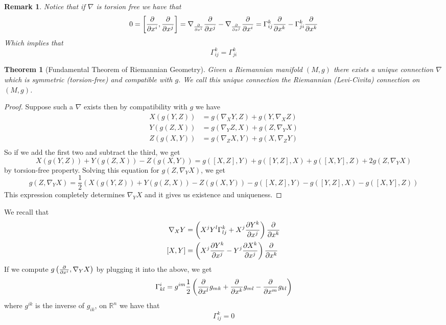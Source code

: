\documentclass[a4paper]{article}
\newtheorem*{thm}{Theorem}
\newtheorem*{rem}{Remark}
\begin{document}
\begin{rem}
 Notice that if $\nabla$ is torsion free we have that
 \[
   0 = \left[ \pdv{x^i}, \pdv{x^j} \right] = \nabla_{\pdv{x^i}} \pdv{x^j} - \nabla_{\pdv{x^j}} \pdv{x^i} = \Gamma_{ij}^k \pdv{x^k} - \Gamma_{ji}^k \pdv{x^k}
 \]
 Which implies that
 \[
   \Gamma_{ij}^k = \Gamma_{ji}^k
 \]
\end{rem}

\begin{thm}[Fundamental Theorem of Riemannian Geometry]
  Given a Riemannian manifold $(M,g)$ there exists a unique connection $\nabla$ which is symmetric (torsion-free) and compatible with $g$. We call this unique connection the Riemannian (Levi-Civita) connection on $(M,g)$.
\end{thm}

\begin{proof}
  Suppose such a $\nabla$ exists then by compatibility with $g$ we have 
  \[
    \begin{aligned}
      X \left( g \left( Y, Z \right) \right) &= g \left( \nabla_X Y, Z \right) + g \left( Y, \nabla_X Z \right) \\
      Y \left( g \left( Z, X \right) \right) &= g \left( \nabla_Y Z, X \right) + g \left( Z, \nabla_Y X \right) \\
      Z \left( g \left( X, Y \right) \right) &= g \left( \nabla_Z X, Y \right) + g \left( X, \nabla_Z Y \right) \\
    \end{aligned}
  \]
  So if we add the first two and subtract the third, we get
  \[
    X(g(Y,Z)) + Y(g(Z,X)) - Z(g(X,Y)) = g([X,Z], Y) + g([Y,Z], X) + g([X,Y],Z) + 2 g (Z, \nabla_Y X)
  \]
  by torsion-free property. Solving this equation for $g(Z, \nabla_Y X)$, we get 
  \[
    g(Z, \nabla_Y X) = \frac{1}{2}  \left( X(g(Y,Z)) + Y(g(Z,X)) - Z(g(X,Y)) - g([X,Z], Y) - g([Y,Z], X) - g([X,Y], Z) \right) 
  \]
  This expression completely determines $\nabla_Y X$ and it gives us existence and uniqueness.
\end{proof}
We recall that
\[
  \begin{aligned}
    \nabla_X Y &= \left(X^jY^l \Gamma_{lj}^k + X^j \pdv{Y^k}{x^j}\right) \pdv{x^k} \\
    [X,Y] &= \left( X^j \pdv{Y^k}{x^j} - Y^j \pdv{X^k}{x^j} \right) \pdv{x^k}
  \end{aligned}
\]
If we compute $g \left( \pdv{x^i}, \nabla_Y X \right)$ by plugging it into the above, we get
\[
  \Gamma_{kl}^i = g^{im} \frac{1}{2} \left( \pdv{x^l}g_{mk} + \pdv{x^k}g_{ml} - \pdv{x^m}g_{kl} \right)
\]
where $g^{ik}$ is the inverse of $g_{ik}$, on $\mathds{R}^n$ we have that
\[
  \Gamma_{ij}^k = 0
\]
\end{document}
